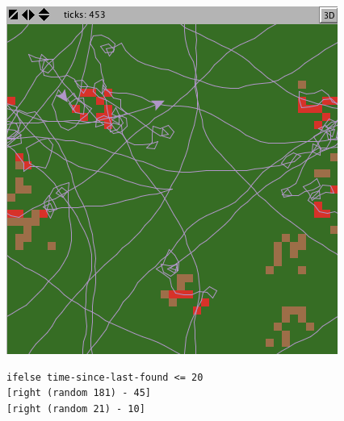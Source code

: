 \documentclass{hw}
\begin{document}
\begin{enumerate}
\begin{minipage}{0.3\textwidth}
\includegraphics[scale=0.3]{ff_03.png}
\end{minipage}

\begin{verbatim}
ifelse time-since-last-found <= 20
[right (random 181) - 45]
[right (random 21) - 10]
\end{verbatim}

\end{enumerate}
\end{document}
